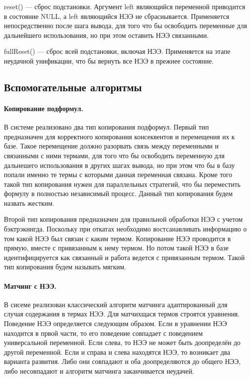 reset() --- сброс подстановки. Аргумент left являющийся переменной приводится в состояние NULL, а left являющийся НЭЭ не сбрасиывается. Применяется непосредственно после шага вывода, для того что бы освободить переменные для дальнейшего использования, но при этом оставить НЭЭ связанными.

fullReset() --- сброс всей подстановки, включая НЭЭ. Применяется на этапе неудачной унификации, что бы вернуть все НЭЭ в прежнее состояние.


\subsection{Вспомогательные алгоритмы}
\paragraph{Копирование подформул.}
В системе реализовано два тип копирования подформул. Первый тип предназначен для корректного копирования консеквентов и перемещения их к базе. Такое перемещение должно разорвать связь между переменными и связанными с ними термами, для того что бы освободить переменную для дальнешего использования в других шагах вывода, но при этом что бы в базу попали именно те термы с которыми данная переменная связана. Кроме того такой тип копирования нужен для параллельных стратегий, что бы переместить формулу в полностью независимый процесс. Данный тип копирования будем назвать жестким.

Второй тип копирования предназначен для правильной обработки НЭЭ с учетом бэктрэкингда. Поскольку при откатах необходимо востсанавливать информацию о том какой НЭЭ был связан с каким термом. Копирование НЭЭ проводится в прямую, вместе с привязанным к нему термом. Но потом такой НЭЭ в базе идентифицируется как связанный и работа ведется с привязанным термом. Такой тип копирования будем называть мягким.


\paragraph{Матчинг с НЭЭ.} В сисеме реализован классический алгоритм матчинга адаптированный для случая содержания в термах НЭЭ. Для матчихщася термов строятся уравнения. Поведение НЭЭ определяется следующим образом. Если в уравнении НЭЭ находится в првой части, то его поведение совпадает с поведением универсальной переменной. Если слева, то НЭЭ не может быть доопределён до другой переменной. Если и справа и слева находятся НЭЭ, то возникает два варианта развития. Либо они совпадают и оба доопределяются до общего НЭЭ, либо несовпадают и алгоритм матчинга заканчивается неудачей.

